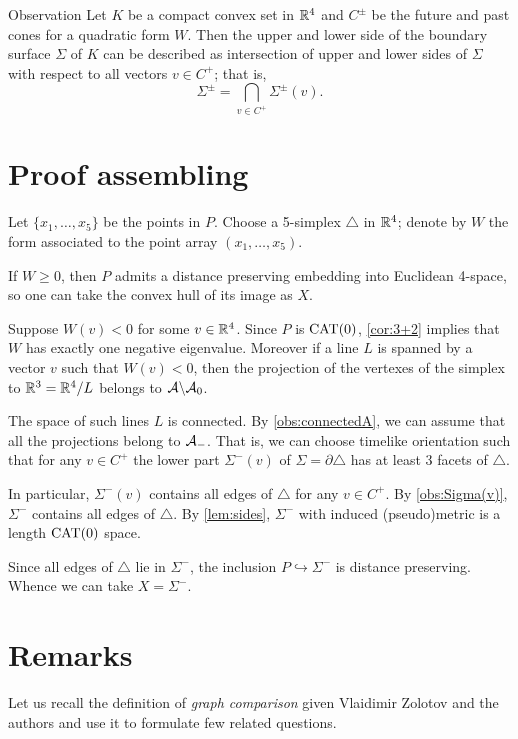 \documentclass{article}
\begin{document}
\begin{thm}{Observation}\label{obs:Sigma(v)}
Let $K$ be a compact convex set in $\mathbb{R}^4$ and $C^\pm$ be the future and past cones for a quadratic form $W$.
Then the upper and lower side of the boundary surface $\Sigma$ of $K$ can be described as intersection of upper and lower sides of $\Sigma$ with respect to all vectors $v\in C^+$;
that is,
\[\Sigma^\pm=\bigcap_{v\in C^+}\Sigma^\pm(v).\]
\end{thm}

\section{Proof assembling}

Let $\{x_1,\dots,x_5\}$ be the points in $P$.
Choose a 5-simplex $\triangle$ in $\mathbb{R}^4$; denote by $W$ the form associated to the point array $(x_1,\dots,x_5)$.

If $W\ge0$, then $P$ admits a distance preserving embedding into Euclidean 4-space, so one can take the convex hull of its image as $X$.

Suppose $W(v)<0$ for some $v\in\mathbb{R}^4$.
Since $P$ is $\mathrm{CAT}(0)$, \ref{cor:3+2} implies that $W$ has exactly one negative eigenvalue.
Moreover if a line $L$ is spanned by a vector $v$ such that $W(v)<0$, then the projection of the vertexes of the simplex to $\mathbb{R}^3=\mathbb{R}^4/L$ belongs to $\mathcal{A}\backslash\mathcal{A}_0$.

The space of such lines $L$ is connected.
By \ref{obs:connectedA}, we can assume that all the projections belong to $\mathcal{A}_-$.
That is, we can choose timelike orientation such that for any $v\in C^+$ the lower part $\Sigma^-(v)$ of $\Sigma=\partial \triangle$ has at least 3 facets of $\triangle$.

In particular, $\Sigma^-(v)$ contains all edges of $\triangle$ for any $v\in C^+$.
By \ref{obs:Sigma(v)}, $\Sigma^-$ contains all edges of $\triangle$.
By \ref{lem:sides}, $\Sigma^-$ with induced (pseudo)metric is a length $\mathrm{CAT}(0)$ space.

Since all edges of $\triangle$ lie in $\Sigma^-$, the inclusion $P\hookrightarrow \Sigma^-$ is distance preserving.
Whence we can take $X=\Sigma^-$.
\qeds

\section{Remarks}

Let us recall the definition of \emph{graph comparison} given Vlaidimir Zolotov and the authors \cite{lebedeva-petrunin-zolotov} and use it to formulate few related questions.
\end{document}
